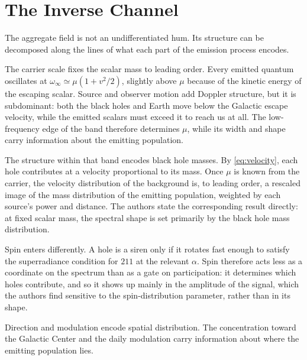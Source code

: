 \documentclass[11pt]{article}
\begin{document}
\section{The Inverse Channel}

The aggregate field is not an undifferentiated hum. Its structure can be decomposed along the lines of what each part of the emission process encodes.

The carrier scale fixes the scalar mass to leading order. Every emitted quantum oscillates at $\omega_{\infty} \simeq \mu(1 + v^{2}/2)$, slightly above $\mu$ because of the kinetic energy of the escaping scalar. Source and observer motion add Doppler structure, but it is subdominant: both the black holes and Earth move below the Galactic escape velocity, while the emitted scalars must exceed it to reach us at all. The low-frequency edge of the band therefore determines $\mu$, while its width and shape carry information about the emitting population.

The structure within that band encodes black hole masses. By \eqref{eq:velocity}, each hole contributes at a velocity proportional to its mass. Once $\mu$ is known from the carrier, the velocity distribution of the background is, to leading order, a rescaled image of the mass distribution of the emitting population, weighted by each source's power and distance. The authors state the corresponding result directly: at fixed scalar mass, the spectral shape is set primarily by the black hole mass distribution.

Spin enters differently. A hole is a siren only if it rotates fast enough to satisfy the superradiance condition for $211$ at the relevant $\alpha$. Spin therefore acts less as a coordinate on the spectrum than as a gate on participation: it determines which holes contribute, and so it shows up mainly in the amplitude of the signal, which the authors find sensitive to the spin-distribution parameter, rather than in its shape.

Direction and modulation encode spatial distribution. The concentration toward the Galactic Center and the daily modulation carry information about where the emitting population lies.
\end{document}
